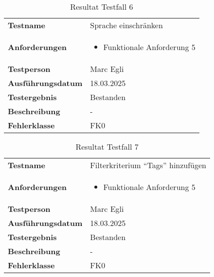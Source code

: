\begin{table}[H]
    \begin{tabular}{|L{0.3\textwidth}|L{0.65\textwidth}|}
        \hline
           \\[10pt]
        \hline
        \textbf{Testname} & Sprache einschränken \\
        \hline
        \textbf{Anforderungen} & 
        \begin{itemize}
            \item Funktionale Anforderung 5
        \end{itemize} \\
        \hline
        \textbf{Testperson} & Marc Egli \\
        \hline
        \textbf{Ausführungsdatum} & 18.03.2025 \\
        \hline
        \textbf{Testergebnis} & Bestanden \\
        \hline
        \textbf{Beschreibung} & - \\ 
        \hline
        \textbf{Fehlerklasse} & FK0 \\ 
        \hline
    \end{tabular}
    \caption{Resultat Testfall 6}
\end{table}

\begin{table}[H]
    \begin{tabular}{|L{0.3\textwidth}|L{0.65\textwidth}|}
        \hline
           \\[10pt]
        \hline
        \textbf{Testname} & Filterkriterium ``Tags'' hinzufügen \\
        \hline
        \textbf{Anforderungen} & 
        \begin{itemize}
            \item Funktionale Anforderung 5
        \end{itemize} \\
        \hline
        \textbf{Testperson} & Marc Egli \\
        \hline
        \textbf{Ausführungsdatum} & 18.03.2025 \\
        \hline
        \textbf{Testergebnis} & Bestanden \\
        \hline
        \textbf{Beschreibung} & - \\ 
        \hline
        \textbf{Fehlerklasse} & FK0 \\ 
        \hline
    \end{tabular}
    \caption{Resultat Testfall 7}
\end{table}

